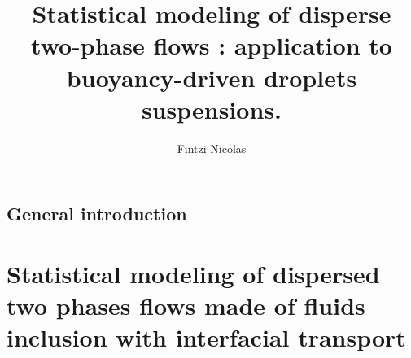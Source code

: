 \documentclass[
    a4paper,                            %
    12pt,                               %
    twoside,                            %
    open=right,                         %
]{My_book}
\title{Statistical modeling of disperse two-phase flows : application to buoyancy-driven droplets suspensions.}
\author{Fintzi Nicolas}
\begin{document}
\dominitoc

\frontmatter
\pagestyle{plain}




\mainmatter



\chapter{General introduction}
\label{part:intro}

\adjustmtc
\minitoc



\part{Statistical modeling of dispersed two phases flows made of fluids inclusion with interfacial transport}
\label{part:one}

\end{document}
